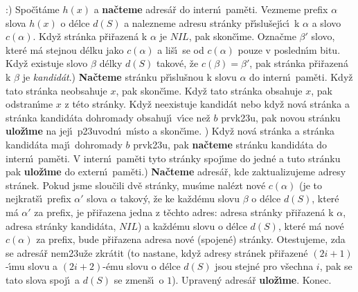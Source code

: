 :) Spo\v c\'\i t\'ame $h\left(x\right)$ a {\bf na\v cteme} adres\'a\v r do intern\'\i\ pam\v eti. 
Vez\-me\-me prefix $\alpha$ slova $h\left(x\right)$ o d\'elce $d\left(S\right)$ a nalezneme 
adresu str\'anky p\v r\'\i slu\v sej\'\i c\'\i\ k $\alpha$ a slovo $
c\left(\alpha \right)$. 
Kdy\v z str\'anka p\v ri\v razen\'a k $\alpha$ je $NIL$, pak skon\v c\'\i me. 
Ozna\v cme $\beta'$ slovo, kter\'e m\'a stejnou d\'elku jako $c\left(\alpha 
\right)$ a 
li\v s\'\i\ se od $c\left(\alpha \right)$ pouze v posledn\'\i m bitu. Kdy\v z existuje 
slovo $\beta$ d\'elky $d\left(S\right)$ takov\'e, \v ze $c\left(\beta \right)=\beta'$, pak str\'anka 
p\v ri\v razen\'a k $\beta$ je \emph{kandid\'at}.) {\bf Na\v cteme} str\'anku p\v r\'\i slu\v snou k slovu $\alpha$ do intern\'\i\ 
pam\v eti. Kdy\v z tato str\'anka neobsahuje $x$, pak skon\v c\'\i me. 
Kdy\v z tato str\'anka obsahuje $x$, pak odstran\'\i me $x$ z t\'eto 
str\'anky. Kdy\v z neexistuje kandid\'at nebo kdy\v z nov\'a 
str\'anka a str\'anka kandid\'ata dohromady obsahuj\'\i\ v\'\i ce ne\v z $
b$ 
prvk\accent23u, pak novou str\'anku {\bf ulo\-\v z\'\i me} na jej\'\i\ 
p\accent23uvodn\'\i\ m\'\i sto a skon\v c\'\i me. \newline 
3) Kdy\v z nov\'a str\'anka a str\'anka kandid\'ata maj\'\i\ 
dohromady $b$ prvk\accent23u, pak {\bf na\v cteme} str\'anku 
kandid\'ata do intern\'\i\ pam\v eti. V intern\'\i\ pam\v eti tyto 
str\'anky spoj\'\i me do jedn\'e a tuto str\'anku pak 
{\bf ulo\-\v z\'\i me} do extern\'\i\ pam\v eti.\newline 
4) {\bf Na\v cteme} adres\'a\v r, kde zaktualizujeme adresy 
str\'anek. Po\-kud jsme slou\v cili dv\v e str\'anky, mus\'\i me nal\'ezt 
nov\'e $c\left(\alpha \right)$ (je to nejkrat\v s\'\i\ prefix $\alpha'$ slova $
\alpha$ takov\'y, \v ze 
ke ka\v zd\'emu slovu $\beta$ o d\'elce $d\left(S\right)$, kter\'e m\'a $\alpha'$ za prefix, 
je p\v ri\v razena jedna z t\v echto adres: adresa str\'anky 
p\v ri\v razen\'a k $\alpha$, adresa str\'anky kandid\'ata, $NIL$) a ka\v zd\'emu 
slovu o d\'elce $d\left(S\right)$, kter\'e m\'a nov\'e $c\left(\alpha \right)$ za prefix, bude 
p\v ri\v razena adresa nov\'e (spojen\'e) str\'anky. Otestujeme, zda 
se adres\'a\v r nem\accent23u\v ze zkr\'atit (to nastane, kdy\v z 
adresy str\'anek p\v ri\v razen\'e $\left(2i+1\right)$-\'\i mu slovu a $\left(2i+
2\right)$-\'emu 
slovu o d\'elce $d\left(S\right)$ jsou stejn\'e pro v\v sechna $i$, 
pak se tato slova spoj\'\i\ a $d\left(S\right)$ se zmen\v s\'\i\ o $1$). Upraven\'y 
adres\'a\v r {\bf ulo\v z\'\i me}. Konec.
\bigskip

